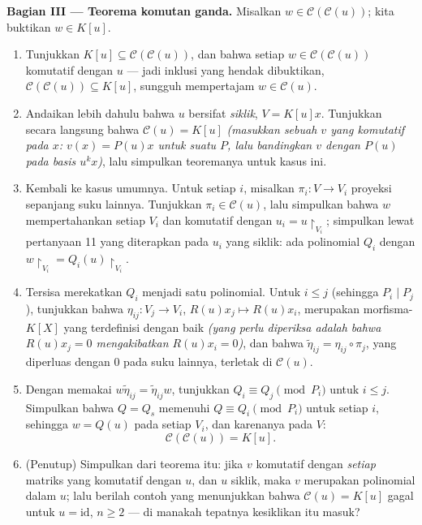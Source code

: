 \begin{problem}
\medskip
\noindent\textbf{Bagian III --- Teorema komutan ganda.}
Misalkan $w \in \mathcal C(\mathcal C(u))$; kita buktikan $w \in K[u]$.
\begin{enumerate}[resume]
  \item Tunjukkan $K[u] \subseteq \mathcal C(\mathcal C(u))$, dan bahwa
        setiap $w \in \mathcal C(\mathcal C(u))$ komutatif dengan $u$
        --- jadi inklusi yang hendak dibuktikan,
        $\mathcal C(\mathcal C(u)) \subseteq K[u]$, sungguh
        mempertajam $w \in \mathcal C(u)$.
  \item Andaikan lebih dahulu bahwa $u$ bersifat \emph{siklik}, $V = K[u]x$.
        Tunjukkan secara langsung bahwa $\mathcal C(u) = K[u]$
        \emph{(masukkan sebuah $v$ yang komutatif pada $x$: $v(x) = P(u)x$
        untuk suatu $P$, lalu bandingkan $v$ dengan $P(u)$ pada basis
        $u^k x$)}, lalu simpulkan teoremanya untuk kasus ini.
  \item Kembali ke kasus umumnya. Untuk setiap $i$, misalkan $\pi_i\colon
        V \to V_i$ proyeksi sepanjang suku lainnya.
        Tunjukkan $\pi_i \in \mathcal C(u)$, lalu simpulkan bahwa $w$
        mempertahankan setiap $V_i$ dan komutatif dengan $u_i =
        u\restriction_{V_i}$; simpulkan lewat pertanyaan 11 yang diterapkan pada
        $u_i$ yang siklik: ada polinomial $Q_i$ dengan
        $w\restriction_{V_i} = Q_i(u)\restriction_{V_i}$.
  \item Tersisa merekatkan $Q_i$ menjadi satu polinomial. Untuk $i
        \leq j$ (sehingga $P_i \mid P_j$), tunjukkan bahwa $\eta_{ij} \colon
        V_j \to V_i$, $R(u)x_j \mapsto R(u)x_i$, merupakan
        morfisma-$K[X]$ yang terdefinisi dengan baik \emph{(yang perlu diperiksa
        adalah bahwa $R(u)x_j = 0$ mengakibatkan $R(u)x_i = 0$)}, dan bahwa
        $\tilde\eta_{ij} = \eta_{ij}\circ\pi_j$, yang diperluas dengan $0$
        pada suku lainnya, terletak di $\mathcal C(u)$.
  \item Dengan memakai $w\tilde\eta_{ij} = \tilde\eta_{ij}w$, tunjukkan $Q_i
        \equiv Q_j \pmod{P_i}$ untuk $i \leq j$. Simpulkan bahwa $Q =
        Q_s$
        memenuhi $Q \equiv Q_i \pmod {P_i}$ untuk setiap $i$, sehingga
        $w = Q(u)$ pada setiap $V_i$, dan karenanya pada $V$:
        \[
        \boxed{\ \mathcal C(\mathcal C(u)) = K[u].\ }
        \]
  \item (Penutup) Simpulkan dari teorema itu: jika $v$ komutatif dengan
        \emph{setiap} matriks yang komutatif dengan $u$, dan $u$
        siklik, maka $v$ merupakan polinomial dalam $u$; lalu berilah
        contoh yang menunjukkan bahwa $\mathcal C(u) = K[u]$ gagal untuk $u =
        \mathrm{id}$, $n \geq 2$ --- di manakah tepatnya
        kesiklikan itu masuk?
\end{enumerate}


\end{problem}
